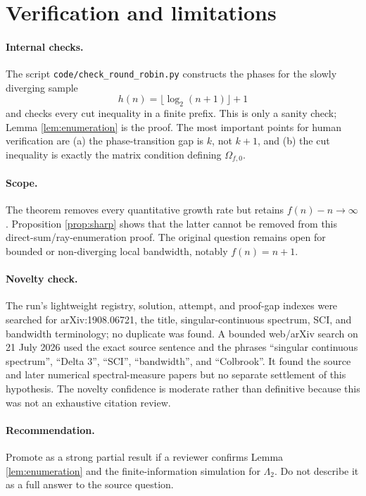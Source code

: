 \documentclass[11pt]{article}
\theoremstyle{remark}
\begin{document}
\section{Verification and limitations}

\paragraph{Internal checks.}
The script \texttt{code/check\_round\_robin.py} constructs the phases for the
slowly diverging sample
\[
 h(n)=\lfloor\log_2(n+1)\rfloor+1
\]
and checks every cut inequality in a finite prefix.  This is only a sanity
check; Lemma \ref{lem:enumeration} is the proof.  The most important points for
human verification are (a) the phase-transition gap is $k$, not $k+1$, and
(b) the cut inequality is exactly the matrix condition defining
$\Omega_{f,0}$.

\paragraph{Scope.}
The theorem removes every quantitative growth rate but retains
$f(n)-n\to\infty$.  Proposition \ref{prop:sharp} shows that the latter cannot
be removed from this direct-sum/ray-enumeration proof.  The original question
remains open for bounded or non-diverging local bandwidth, notably
$f(n)=n+1$.

\paragraph{Novelty check.}
The run's lightweight registry, solution, attempt, and proof-gap indexes were
searched for arXiv:1908.06721, the title, singular-continuous spectrum, SCI,
and bandwidth terminology; no duplicate was found.  A bounded web/arXiv search
on 21 July 2026 used the exact source sentence and the phrases
``singular continuous spectrum'', ``Delta 3'', ``SCI'', ``bandwidth'', and
``Colbrook''.  It found the source and later numerical spectral-measure papers
but no separate settlement of this hypothesis.  The novelty confidence is
moderate rather than definitive because this was not an exhaustive citation
review.

\paragraph{Recommendation.}
Promote as a strong partial result if a reviewer confirms Lemma
\ref{lem:enumeration} and the finite-information simulation for $\Lambda_2$.
Do not describe it as a full answer to the source question.
\end{document}
